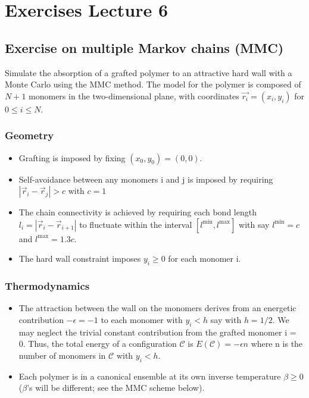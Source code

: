 \documentclass[../main.tex]{subfiles}
\begin{document}
\chapter{Exercises Lecture 6}


\section{Exercise on multiple Markov chains (MMC)}

Simulate the absorption of a grafted polymer to an attractive hard wall with a Monte Carlo using the MMC
method. The model for the polymer is composed of $N+1$ monomers in the two-dimensional plane, with
coordinates $\vec{r_{i}}=(x_{i},y_{i})$ for $0\le i\le N$.

\subsection*{Geometry}

\begin{itemize}
    \item Grafting is imposed by fixing $(x_{0},y_{0})=(0,0)$.

    \item Self-avoidance between any monomers i and j is imposed by requiring $|\vec{r}_{i}-\vec{r}_{j}|>c$ with $c=1$ 

    \item The chain connectivity is achieved by requiring each bond length $l_{i}=|\vec{r}_{i}-\vec{r}_{i+1}|$ to fluctuate within
    the interval $[l^\text{min}, l^{\text{max}}]$ with say $l^{\text{min}}=c$ and $l^{\text{max}}=1.3c.$ 

    \item The hard wall constraint imposes $y_{i}\ge0$ for each monomer i.
\end{itemize}

\subsection*{Thermodynamics}

\begin{itemize}
    \item The attraction between the wall on the monomers derives from an energetic contribution $-\epsilon=-1$ to each monomer with $y_{i}<h$ say with $h=1/2.$ We may neglect the trivial constant contribution from the grafted monomer i = 0. Thus, the total energy of a configuration $\mathcal{C}$ is $E(\mathcal{C})=-\epsilon n$ where n is the number of monomers in $\mathcal{C}$ with $y_{i}<h$.
    \item Each polymer is in a canonical ensemble at its own inverse temperature $\beta\ge0$ ($\beta$'s will be different;    see the MMC scheme below).
\end{itemize}
\end{document}
